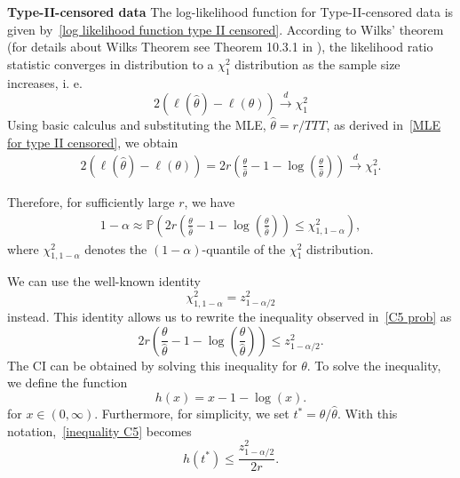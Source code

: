 \textbf{Type-II-censored data}
The log-likelihood function for Type-II-censored data is given by~\eqref{log likelihood function type II censored}.
According to Wilks' theorem (for details about Wilks Theorem see Theorem 10.3.1 in \cite{casella2002statistical}), the likelihood ratio statistic converges in distribution to a $\chi^2_1$ distribution as the sample size increases, i. e. 
\begin{equation} \label{Wilks Theorem}
	2\left(\ell(\hat{\theta})-\ell(\theta)\right)
	\overset{d}{\longrightarrow}
	\chi^2_1
\end{equation}
Using basic calculus and substituting the MLE, \(\hat{\theta}=r/TTT\), as derived in~\eqref{MLE for type II censored}, we obtain
\begin{align} \label{log likelihood wilk}
	2\left(\ell(\hat{\theta})-\ell(\theta)\right)
	=
	2r\left(
	\frac{\theta}{\hat{\theta}}-1
	-\log\left(\frac{\theta}{\hat{\theta}}\right)
	\right) 
	\overset{d}{\longrightarrow}
	\chi^2_1
	.
\end{align}

Therefore, for sufficiently large \(r\), we have
\begin{align} \label{C5 prob}
	1-\alpha \approx
	\mathbb{P}\left(
	2r  \left(
	\frac{\theta}{\hat\theta}-1
	-\log\left(\frac{\theta}{\hat\theta}\right)
	\right)
	\leq \chi^2_{1,1-\alpha}
	\right),
\end{align}
where \(\chi^2_{1,1-\alpha}\) denotes the \((1-\alpha)\)-quantile of the $\chi^2_1$ distribution.

We can use the well-known identity
\[
\chi^2_{1,1-\alpha}=z_{1-\alpha/2}^2
\]
instead. This identity allows us to rewrite the inequality observed in~\eqref{C5 prob} as
\begin{equation} \label{inequality C5}
	2 r \left(
	\frac{\theta}{\hat{\theta}}-1
	-\log\left(\frac{\theta}{\hat{\theta}}\right)
	\right)
	\leq z_{1-\alpha/2}^2.
\end{equation}
The CI can be obtained by solving this inequality for \(\theta\).
To solve the inequality, we define the function
\[
h(x)=x-1-\log(x).
\]
for $x \in (0, \infty)$.
Furthermore, for simplicity, we set \(t^*=\theta/\hat{\theta}\). With this notation,~\eqref{inequality C5} becomes
\begin{equation} \label{inequality C5 h}
	h(t^*) \leq \frac{z_{1-\alpha/2}^2}{2r}.
\end{equation}

